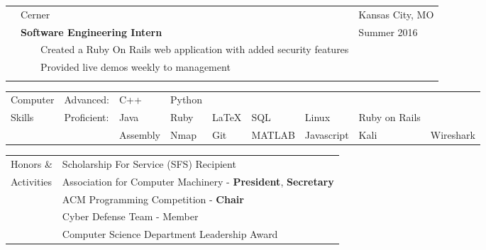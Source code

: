 \documentclass[10.5pt, arial]{article}
\newcommand{\tabitem}{~~\llap{\textbullet}~~}
\begin{document}
\begin{tabular}{p{1.5cm} p{13.2cm} l}
			& Cerner 															& Kansas City, MO 		\\
			& \textbf{Software Engineering Intern} 								& Summer 2016			\\
			& \tabitem Created a Ruby On Rails web application with added security features					& 						\\
			& \tabitem Provided live demos weekly to management 				& 						\\ \\
\end{tabular}

\begin{tabular}{p{1.5cm} l l l l l l l l}
Computer	& Advanced: 	& C++ 		& Python 	& 			& 			& 			& 					\\
Skills		& Proficient:	& Java 		& Ruby 		& \LaTeX 	& SQL 		& Linux   	& Ruby on Rails	& \\
			&			 	& Assembly 	& Nmap 		& Git 		& MATLAB	& Javascript& Kali		& Wireshark	\\
\end{tabular}

\begin{tabular}{p{1.5cm} l}
Honors \&	& Scholarship For Service (SFS) Recipient 							\\
Activities	& Association for Computer Machinery - \textbf{President}, \textbf{Secretary}			\\
			& ACM Programming Competition - \textbf{Chair}						\\
			& Cyber Defense Team - Member										\\
			& Computer Science Department Leadership Award 						\\
\end{tabular}
\end{document}

